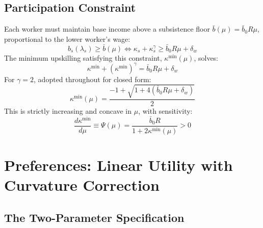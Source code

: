 \documentclass[12pt,a4paper]{article}
\begin{document}
\subsection{Participation Constraint}

Each worker must maintain base income above a subsistence floor
$\bar{b}(\mu) = \bar{b}_0 R\mu$, proportional to the lower worker's
wage:
\begin{equation}
  b_s(\lambda_s) \geq \bar{b}(\mu)
  \iff
  \kappa_s + \kappa_s^\gamma \geq \bar{b}_0 R\mu + \delta_w
  \label{eq:pc}
\end{equation}
The minimum upskilling satisfying this constraint, $\kappa^{\min}(\mu)$,
solves:
\begin{equation}
  \kappa^{\min} + \left(\kappa^{\min}\right)^\gamma
  = \bar{b}_0 R\mu + \delta_w
  \label{eq:kappa_min}
\end{equation}
For $\gamma = 2$, adopted throughout for closed form:
\begin{equation}
  \kappa^{\min}(\mu)
  = \frac{-1 + \sqrt{1 + 4(\bar{b}_0 R\mu + \delta_w)}}{2}
  \label{eq:kappa_min_gamma2}
\end{equation}
This is strictly increasing and concave in $\mu$, with sensitivity:
\begin{equation}
  \frac{d\kappa^{\min}}{d\mu} \equiv \Psi(\mu)
  = \frac{\bar{b}_0 R}{1 + 2\kappa^{\min}(\mu)} > 0
  \label{eq:dkdmu}
\end{equation}

\section{Preferences: Linear Utility with Curvature Correction}

\subsection{The Two-Parameter Specification}
\end{document}

